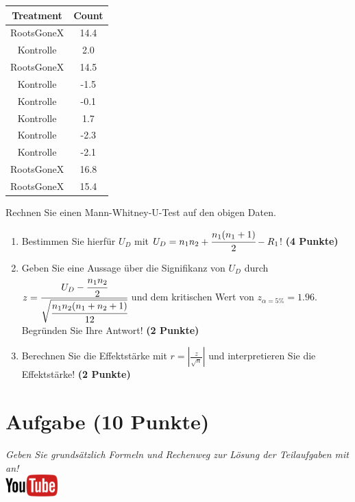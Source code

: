 \documentclass[a4paper, 9pt]{scrartcl}\usepackage[]{graphicx}\usepackage[]{xcolor}
\newenvironment{knitrout}{}{} %
\begin{document}
\begin{knitrout}
\color{fgcolor}\begin{table}[!h]
\centering
\begin{tabular}{cc}
\toprule
Treatment & Count\\
\midrule
RootsGoneX & 14.4\\
Kontrolle & 2.0\\
RootsGoneX & 14.5\\
Kontrolle & -1.5\\
Kontrolle & -0.1\\
\addlinespace
Kontrolle & 1.7\\
Kontrolle & -2.3\\
Kontrolle & -2.1\\
RootsGoneX & 16.8\\
RootsGoneX & 15.4\\
\bottomrule
\end{tabular}
\end{table}

\end{knitrout}

Rechnen Sie einen Mann-Whitney-U-Test auf den obigen Daten.

\begin{enumerate}
\item Bestimmen Sie hierf{\"u}r $U_D$ mit $U_D = n_1n_2 +
  \cfrac{n_1(n_1+1)}{2}-R_1$! \textbf{(4 Punkte)} 
\item Geben Sie eine Aussage {\"u}ber die Signifikanz von $U_D$ durch
  $z = \cfrac{U_D -
    \cfrac{n_1n_2}{2}}{\sqrt{\cfrac{n_1n_2(n_1+n_2+1)}{12}}}$ und dem
  kritischen Wert von $z_{\alpha = 5\%} = 1.96$. Begr{\"u}nden Sie Ihre
  Antwort! \textbf{(2 Punkte)}
\item Berechnen Sie die Effektst{\"a}rke mit $r = |\frac{z}{\sqrt{n}}| $ und
  interpretieren Sie die Effektst{\"a}rke! \textbf{(2 Punkte)} 
\end{enumerate} 
\clearpage

\section{Aufgabe \hfill (10 Punkte)}

\textit{Geben Sie grunds{\"a}tzlich Formeln und Rechenweg zur L{\"o}sung der
  Teilaufgaben mit an!} \\[1Ex]

\hfill\href{https://youtu.be/gC0SXiIG2wQ}{\includegraphics[width =
  2cm]{img/youtube}} %
\hspace{2Ex}
\end{document}

